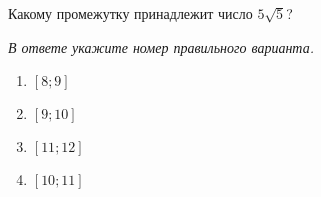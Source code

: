 Какому промежутку принадлежит число $5\sqrt{5}$?

\textit{В ответе укажите номер правильного варианта.}
\begin{multicols}{4}
	\begin{enumerate}[label=\arabic*)]
		\item $[8;9]$
		\item $[9;10]$
		\item $[11;12]$
		\item $[10;11]$
	\end{enumerate}
\end{multicols}